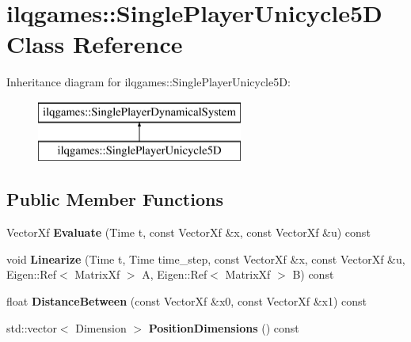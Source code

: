 \hypertarget{classilqgames_1_1_single_player_unicycle5_d}{}\section{ilqgames\+:\+:Single\+Player\+Unicycle5D Class Reference}
\label{classilqgames_1_1_single_player_unicycle5_d}
Inheritance diagram for ilqgames\+:\+:Single\+Player\+Unicycle5D\+:\begin{figure}[H]
\begin{center}
\leavevmode
\includegraphics[height=2.000000cm]{classilqgames_1_1_single_player_unicycle5_d}
\end{center}
\end{figure}
\subsection*{Public Member Functions}
\begin{DoxyCompactItemize}
\item 
Vector\+Xf {\bfseries Evaluate} (Time t, const Vector\+Xf \&x, const Vector\+Xf \&u) const \hypertarget{classilqgames_1_1_single_player_unicycle5_d_a51f0dd94b0872632256ab0e31b760569}{}\label{classilqgames_1_1_single_player_unicycle5_d_a51f0dd94b0872632256ab0e31b760569}

\item 
void {\bfseries Linearize} (Time t, Time time\+\_\+step, const Vector\+Xf \&x, const Vector\+Xf \&u, Eigen\+::\+Ref$<$ Matrix\+Xf $>$ A, Eigen\+::\+Ref$<$ Matrix\+Xf $>$ B) const \hypertarget{classilqgames_1_1_single_player_unicycle5_d_abdfb1b8da8b6a60deacd6de1e2370264}{}\label{classilqgames_1_1_single_player_unicycle5_d_abdfb1b8da8b6a60deacd6de1e2370264}

\item 
float {\bfseries Distance\+Between} (const Vector\+Xf \&x0, const Vector\+Xf \&x1) const \hypertarget{classilqgames_1_1_single_player_unicycle5_d_ac20c427901e0e594d63155d0d7944b70}{}\label{classilqgames_1_1_single_player_unicycle5_d_ac20c427901e0e594d63155d0d7944b70}

\item 
std\+::vector$<$ Dimension $>$ {\bfseries Position\+Dimensions} () const \hypertarget{classilqgames_1_1_single_player_unicycle5_d_a0245cb33ac6ed95ce5331692c36e2a0d}{}\label{classilqgames_1_1_single_player_unicycle5_d_a0245cb33ac6ed95ce5331692c36e2a0d}

\end{DoxyCompactItemize}
